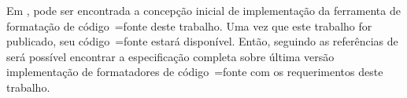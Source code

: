 Em ,
pode ser encontrada a concepção inicial de implementação da ferramenta de formatação de código~=fonte deste trabalho.
Uma vez que este trabalho for publicado,
seu código~=fonte estará disponível.
Então,
seguindo as referências de  será possível encontrar a especificação completa sobre última versão implementação de formatadores de código~=fonte com os requerimentos deste trabalho.

